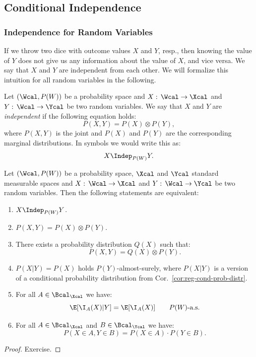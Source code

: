 \subsection{Conditional Independence}


\subsubsection{Independence for Random Variables}

\begin{Motivation}
    If we throw two dice with outcome values $X$ and $Y$, resp., then knowing the value of $Y$ does not give us any information about the value of $X$, and vice versa. We say that $X$ and $Y$ are independent from each other. We will formalize this intuition for all random variables in the following.
\end{Motivation}

\begin{Def}
    \label{def:indep-rv}
    Let $(\Wcal,P(W))$ be a probability space and $X:\, \Wcal \to \Xcal$ and $Y:\, \Wcal \to \Ycal$ be two random variables.
    We say that $X$ and $Y$ are \emph{independent} if the following equation holds:
    \[
        P(X,Y) = P(X) \otimes P(Y),
    \]
    where $P(X,Y)$ is the joint and $P(X)$ and $P(Y)$ are the corresponding marginal distributions.
    In symbols we would write this as:
    \[ X \Indep_{P(W)} Y.\]
\end{Def}

\begin{Lem}
    \label{lem:indep-rv}
     Let $(\Wcal,P(W))$ be a probability space, $\Xcal$ and $\Ycal$ standard measurable spaces 
     and $X:\, \Wcal \to \Xcal$ and $Y:\, \Wcal \to \Ycal$ be two random variables.
     Then the following statements are equivalent:
     \begin{enumerate}
         \item $\displaystyle X \Indep_{P(W)} Y$.
         \item $P(X,Y) = P(X) \otimes P(Y)$.
         \item There exists a probability distribution $Q(X)$ such that:
             \[ P(X,Y) = Q(X) \otimes P(Y).\]
         \item $P(X|Y) = P(X)$ holds $P(Y)$-almost-surely, 
             where $P(X|Y)$ is a version of a conditional probability distribution from Cor.\ \ref{cor:reg-cond-prob-distr}. 
         \item For all $A \in \Bcal_\Xcal$ we have:
             \[ \E[\I_A(X)|Y] = \E[\I_A(X)] \qquad P(W)\text{-a.s.}\]
         \item For all $A \in \Bcal_\Xcal$ and $B \in \Bcal_\Ycal$ we have:
             \[ P(X \in A, Y \in B) = P(X \in A) \cdot P(Y \in B). \]
     \end{enumerate}
     \begin{proof}
         Exercise.
     \end{proof}
\end{Lem}

